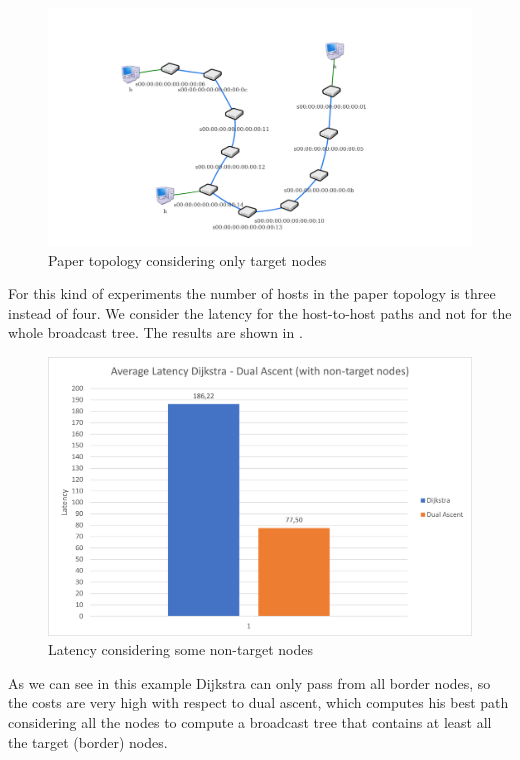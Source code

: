 \begin{figure}[bht]
	\centering
	\includegraphics[width=\textwidth]{img/paper-topo-onlytarget.png}
	\caption{Paper topology considering only target
	nodes}\label{fig:paper-target}
\end{figure}

For this kind of experiments the number of hosts in the paper topology is three
instead of four. We consider the latency for the host-to-host paths and not for
the whole broadcast tree. The results are shown in
.

\begin{figure}
	\centering
	\includegraphics[width=\textwidth]{img/lat-mean-target.png}
	\caption{Latency considering some non-target
	nodes}\label{fig:lat-mean-target}
\end{figure}

As we can see in this example Dijkstra can only pass from all border nodes, so
the costs are very high with respect to dual ascent, which computes his best
path considering all the nodes to compute a broadcast tree that contains at
least all the target (border) nodes.
